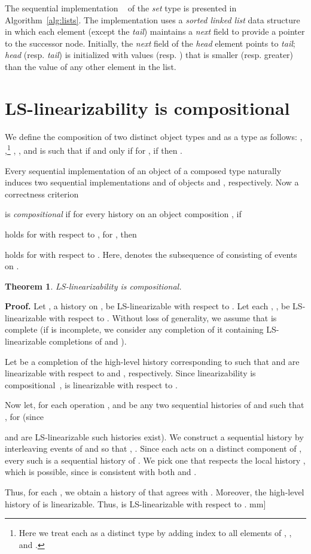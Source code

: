 \documentclass[11pt,pdftex,letterpaper]{article}
\newtheorem{theorem}{Theorem}
\newenvironment{proof}[1][Proof]{\noindent\textbf{#1.} }{\hfill \2mm]}
\newcommand{\LS}{LS}
\newcommand{\LL}{\ms{LL}}
\begin{document}
 The sequential implementation \LL~ of the \emph{set} type is
presented in Algorithm~\ref{alg:lists}. The implementation uses a \emph{sorted linked list} data structure 
in which each element (except the \emph{tail}) maintains a \textit{next} field to provide a pointer to the
successor node. Initially, the \emph{next} field of the \emph{head} element points to \emph{tail}; \emph{head}
(resp. \emph{tail}) is initialized with values  (resp. ) that is smaller (resp. greater) than
the value of any other element in the list.


\section{\LS-linearizability is compositional}
\label{app:comp}
We define the composition of two distinct object types  and  
as a type  as follows: 
, ,\footnote{Here we treat each  as a distinct type by adding
index  to all elements of , , and .}   
,
, and   is such that  if and only if for , if 
 then   .

Every sequential implementation  of an object   of a
composed type  naturally induces two sequential
implementations  and  of objects  and ,
respectively. 
Now a correctness criterion 

is \emph{compositional} if for every
history  on an object composition , 
if 

holds for  with
respect to , for , then

holds for  with
respect to .
Here,  denotes the subsequence of  consisting of events on .
\begin{theorem}
\label{th:comp}
\LS-linearizability is compositional. 
\end{theorem}
\begin{proof}
Let , a history on ,  be \LS-linearizable
with respect to . 
Let each , 
, 
be \LS-linearizable with respect to . 
Without loss of generality,  we assume that  is complete (if 
is incomplete, we consider any completion of it containing
\LS-linearizable completions of   and ).

Let  be a completion of the high-level history corresponding to  such that
 and  are linearizable with respect to 
and , respectively. Since linearizability is
compositional~\cite{HW90,HS08-book},  is linearizable with respect to .

Now let, for each operation ,  and  be any two sequential histories of
 and   such that , for 
(since 

and  are \LS-linearizable such histories exist).
We construct a sequential history  by interleaving events of
 and  so that , 
.
Since each  acts on a distinct component  of , every such  is a sequential history of .
We pick one  that respects the local history ,
which is possible, since  is consistent with both    
 and . 

Thus, for each , we obtain a history of  that agrees with
. Moreover, the high-level history of  is linearizable. Thus,  is \LS-linearizable with respect to . 
\end{proof}
\end{document}
